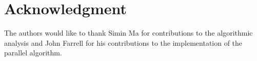 \section*{Acknowledgment}

The authors would like to thank Simin Ma for contributions to the algorithmic analysis and John Farrell for his contributions to the implementation of the parallel algorithm.

